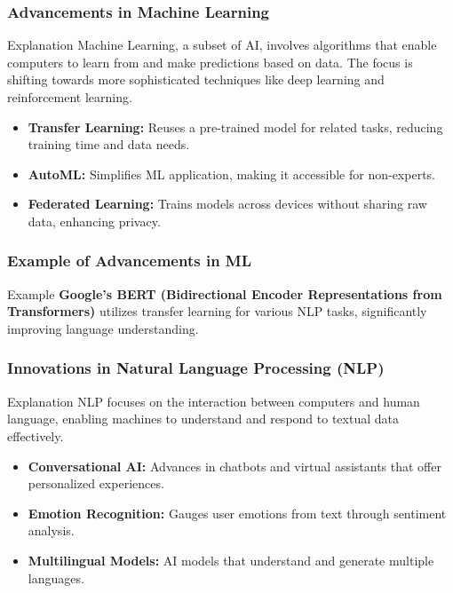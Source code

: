 \documentclass{beamer}
\begin{document}
\begin{frame}[fragile]
    \frametitle{Advancements in Machine Learning}
    \begin{block}{Explanation}
        Machine Learning, a subset of AI, involves algorithms that enable computers to learn from and make predictions based on data. The focus is shifting towards more sophisticated techniques like deep learning and reinforcement learning.
    \end{block}
    \begin{itemize}
        \item \textbf{Transfer Learning:} Reuses a pre-trained model for related tasks, reducing training time and data needs.
        \item \textbf{AutoML:} Simplifies ML application, making it accessible for non-experts.
        \item \textbf{Federated Learning:} Trains models across devices without sharing raw data, enhancing privacy.
    \end{itemize}
\end{frame}

\begin{frame}[fragile]
    \frametitle{Example of Advancements in ML}
    \begin{block}{Example}
        \textbf{Google's BERT (Bidirectional Encoder Representations from Transformers)} utilizes transfer learning for various NLP tasks, significantly improving language understanding.
    \end{block}
\end{frame}

\begin{frame}[fragile]
    \frametitle{Innovations in Natural Language Processing (NLP)}
    \begin{block}{Explanation}
        NLP focuses on the interaction between computers and human language, enabling machines to understand and respond to textual data effectively.
    \end{block}
    \begin{itemize}
        \item \textbf{Conversational AI:} Advances in chatbots and virtual assistants that offer personalized experiences.
        \item \textbf{Emotion Recognition:} Gauges user emotions from text through sentiment analysis.
        \item \textbf{Multilingual Models:} AI models that understand and generate multiple languages.
    \end{itemize}
\end{frame}
\end{document}
